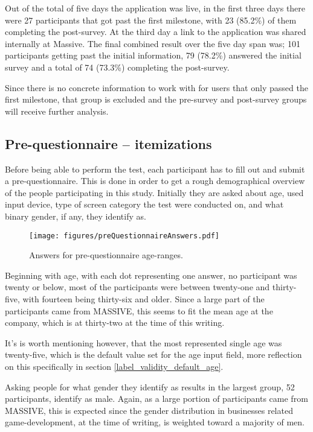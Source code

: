 	Out of the total of five days the application was live, in the first
	three days there were 27 participants that got past the first milestone,
	with 23 (85.2\%) of them completing the post-survey. At the third day a
	link to the application was shared internally at Massive. The final
	combined result over the five day span was; 101 participants getting past
	the initial information, 79 (78.2\%) answered the initial survey and a
	total of 74 (73.3\%) completing the post-survey.

	Since there is no concrete information to work with for users that only
	passed the first milestone, that group is excluded and the pre-survey and
	post-survey groups will receive further analysis.

  \subsection{Pre-questionnaire -- itemizations}

    Before being able to perform the test, each participant has to fill
    out and submit a pre-questionnaire. This is done in order to get
    a rough demographical overview of the people participating in this
    study. Initially they are asked about age, used input device, type of
    screen category the test were conducted on, and what binary gender, if
    any, they identify as.

    \begin{figure}[h!]
      \centering
      \texttt{[image: figures/preQuestionnaireAnswers.pdf]}
      \caption{Answers for pre-questionnaire age-ranges.}
    \end{figure}

    Beginning with age, with each dot representing one answer, no
    participant was twenty or below, most of the  participants were between
    twenty-one and thirty-five, with fourteen being thirty-six and older.
    Since a large part of the participants came from MASSIVE, this seems to
    fit the mean age at the company, which is at thirty-two at
    the time of this writing.

    It's is worth mentioning however, that the most represented single age
    was twenty-five, which is the default value set for the age input
    field, more reflection on this specifically in section
    \ref{label_validity_default_age}.

		\newpage
    Asking people for what gender they identify as results in the largest
    group, 52 participants, identify as male. Again, as a large portion of
    participants came from MASSIVE, this is expected since the gender
    distribution in businesses related game-development, at the time of
    writing, is weighted toward a majority of men\cite[p.16]{citeIndex2019}.

